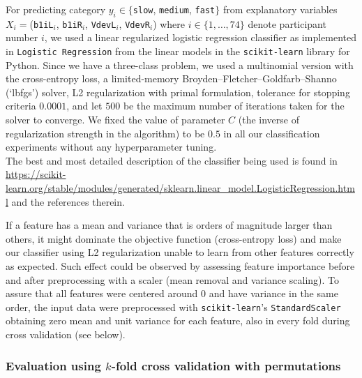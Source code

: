 \documentclass[10pt,letterpaper]{article}
\begin{document}
\vspace{5mm}


For predicting category $y_i \in \{${\tt slow}, {\tt medium}, {\tt fast}$\}$  from explanatory variables
$X_i = $({\tt b1iL}$_i$, {\tt b1iR}$_i$, {\tt VdevL}$_i$, {\tt VdevR}$_i$) where $i \in \{1, \ldots, 74\}$
denote participant number $i$, we used a linear regularized logistic regression classifier as implemented in 
{\tt Logistic Regression} from the linear models in the {\tt scikit-learn} library for Python. 
Since we have a three-class problem, we used a multinomial version 
with the cross-entropy loss, a limited-memory Broyden–Fletcher–Goldfarb–Shanno (`lbfgs') solver,
L2 regularization with primal formulation, tolerance for stopping criteria $0.0001$, and let $500$ be the maximum number of iterations taken for the solver to converge. We fixed the value of parameter $C$ (the inverse of regularization strength in the algorithm) to be  $0.5$ 
in all our classification experiments without any hyperparameter tuning. \\
The best and most detailed description of the classifier being used is found 
in {\scriptsize  \url{ https://scikit-learn.org/stable/modules/generated/sklearn.linear_model.LogisticRegression.html}} and the references therein.


If a feature has a mean and variance that is orders of magnitude larger than others, it might dominate the objective function (cross-entropy loss) and make our classifier using L2 regularization unable to learn from other features correctly as expected. Such effect could be observed by assessing feature importance before and after preprocessing with a scaler (mean removal and variance scaling). To assure that
all features were centered around $0$ and have variance in the same order, the input data were preprocessed with {\tt scikit-learn}'s {\tt StandardScaler} obtaining zero mean and unit variance for each feature, also in every fold during cross validation (see below).


\subsubsection{Evaluation using $k$-fold cross validation with permutations} 
\end{document}
